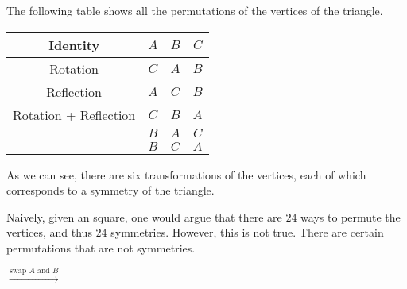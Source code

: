 \begin{example}[Continued]
    The following table shows all the permutations of the vertices of the triangle. 

    \begin{table}[ht!]
        \centering
        \begin{tabular}{|c|c|c|c|}
            \hline
            Identity & $A$ & $B$ & $C$ \\
            \hline
            Rotation & $C$ & $A$ & $B$ \\
            \hline
            Reflection & $A$ & $C$ & $B$ \\
            \hline
            Rotation + Reflection & $C$ & $B$ & $A$ \\
            \hline \hline
            & $B$ & $A$ & $C$ \\
            \hline
            & $B$ & $C$ & $A$ \\
            \hline
        \end{tabular}
    \end{table}

    As we can see, there are six transformations of the vertices, each of which corresponds to a symmetry of the triangle. 
\end{example}

Naively, given an square, one would argue that there are $24$ ways to permute the vertices, and thus $24$ symmetries. However, this is not true. There are certain permutations that are not symmetries. 

\begin{center}
    $\xrightarrow{\text{swap } A \text{ and } B}$
\end{center}

